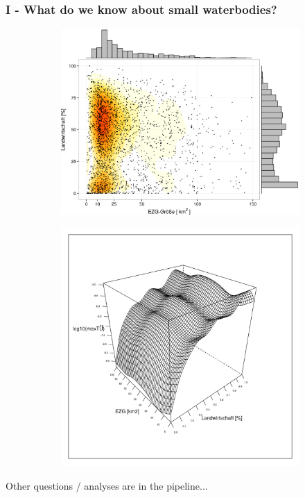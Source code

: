 \documentclass[12pt, t]{beamer}
\begin{document}
\begin{frame}
\frametitle{I - What do we know about small waterbodies?}
\begin{figure}
\centering
\begin{subfigure}{.5\textwidth}
  \centering
    \includegraphics[width=\linewidth]{fig/ezg_lu.png}

\end{subfigure}%
\pause
\begin{subfigure}{.5\textwidth}
  \centering
  \includegraphics[width=\linewidth]{fig/lu_ezg_agri_cens.png}
\end{subfigure}
\end{figure}
Other questions / analyses are in the pipeline...
\end{frame}
\end{document}
